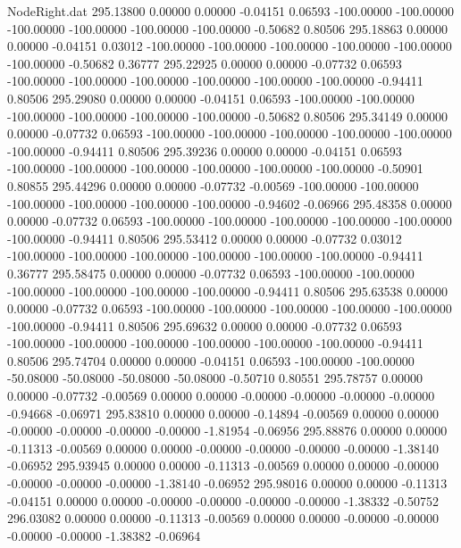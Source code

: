 \begin{filecontents}{NodeRight.dat}
 295.13800    0.00000    0.00000    -0.04151    0.06593 -100.00000 -100.00000 -100.00000 -100.00000 -100.00000 -100.00000   -0.50682    0.80506
 295.18863    0.00000    0.00000    -0.04151    0.03012 -100.00000 -100.00000 -100.00000 -100.00000 -100.00000 -100.00000   -0.50682    0.36777
 295.22925    0.00000    0.00000    -0.07732    0.06593 -100.00000 -100.00000 -100.00000 -100.00000 -100.00000 -100.00000   -0.94411    0.80506
 295.29080    0.00000    0.00000    -0.04151    0.06593 -100.00000 -100.00000 -100.00000 -100.00000 -100.00000 -100.00000   -0.50682    0.80506
 295.34149    0.00000    0.00000    -0.07732    0.06593 -100.00000 -100.00000 -100.00000 -100.00000 -100.00000 -100.00000   -0.94411    0.80506
 295.39236    0.00000    0.00000    -0.04151    0.06593 -100.00000 -100.00000 -100.00000 -100.00000 -100.00000 -100.00000   -0.50901    0.80855
 295.44296    0.00000    0.00000    -0.07732   -0.00569 -100.00000 -100.00000 -100.00000 -100.00000 -100.00000 -100.00000   -0.94602   -0.06966
 295.48358    0.00000    0.00000    -0.07732    0.06593 -100.00000 -100.00000 -100.00000 -100.00000 -100.00000 -100.00000   -0.94411    0.80506
 295.53412    0.00000    0.00000    -0.07732    0.03012 -100.00000 -100.00000 -100.00000 -100.00000 -100.00000 -100.00000   -0.94411    0.36777
 295.58475    0.00000    0.00000    -0.07732    0.06593 -100.00000 -100.00000 -100.00000 -100.00000 -100.00000 -100.00000   -0.94411    0.80506
 295.63538    0.00000    0.00000    -0.07732    0.06593 -100.00000 -100.00000 -100.00000 -100.00000 -100.00000 -100.00000   -0.94411    0.80506
 295.69632    0.00000    0.00000    -0.07732    0.06593 -100.00000 -100.00000 -100.00000 -100.00000 -100.00000 -100.00000   -0.94411    0.80506
 295.74704    0.00000    0.00000    -0.04151    0.06593 -100.00000 -100.00000  -50.08000  -50.08000  -50.08000  -50.08000   -0.50710    0.80551
 295.78757    0.00000    0.00000    -0.07732   -0.00569    0.00000    0.00000   -0.00000   -0.00000   -0.00000   -0.00000   -0.94668   -0.06971
 295.83810    0.00000    0.00000    -0.14894   -0.00569    0.00000    0.00000   -0.00000   -0.00000   -0.00000   -0.00000   -1.81954   -0.06956
 295.88876    0.00000    0.00000    -0.11313   -0.00569    0.00000    0.00000   -0.00000   -0.00000   -0.00000   -0.00000   -1.38140   -0.06952
 295.93945    0.00000    0.00000    -0.11313   -0.00569    0.00000    0.00000   -0.00000   -0.00000   -0.00000   -0.00000   -1.38140   -0.06952
 295.98016    0.00000    0.00000    -0.11313   -0.04151    0.00000    0.00000   -0.00000   -0.00000   -0.00000   -0.00000   -1.38332   -0.50752
 296.03082    0.00000    0.00000    -0.11313   -0.00569    0.00000    0.00000   -0.00000   -0.00000   -0.00000   -0.00000   -1.38382   -0.06964

\end{filecontents}
